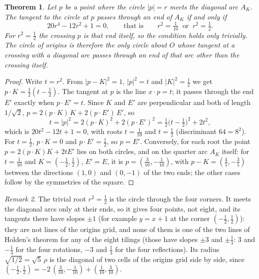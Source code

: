 \documentclass[11pt,a4paper]{article}
\theoremstyle{plain}
\newtheorem{theorem}{Theorem}
\theoremstyle{definition}
\theoremstyle{remark}
\newtheorem{remark}[theorem]{Remark}
\begin{document}
\begin{theorem}\label{thm:unique}
Let $p$ be a point where the circle $|p|=r$ meets the diagonal arc $A_K$. The tangent to the circle at $p$ passes through an end of $A_K$ if and only if
\[
  20r^4-12r^2+1=0, \qquad\text{that is}\qquad r^2=\tfrac1{10}\ \text{ or }\ r^2=\tfrac12 .
\]
For $r^2=\tfrac12$ the crossing $p$ is that end itself, so the condition holds only trivially. The circle of origins is therefore the only circle about $O$ whose tangent at a crossing with a diagonal arc passes through an end of that arc other than the crossing itself.
\end{theorem}

\begin{proof}
Write $t=r^2$. From $|p-K|^2=1$, $|p|^2=t$ and $|K|^2=\tfrac12$ we get $p\cdot K=\tfrac12(t-\tfrac12)$. The tangent at $p$ is the line $x\cdot p=t$; it passes through the end $E'$ exactly when $p\cdot E'=t$. Since $K$ and $E'$ are perpendicular and both of length $1/\sqrt2$, $p=2(p\cdot K)\,K+2(p\cdot E')\,E'$, so
\[
  t=|p|^2 = 2(p\cdot K)^2 + 2(p\cdot E')^2 = \tfrac12\bigl(t-\tfrac12\bigr)^2 + 2t^2 ,
\]
which is $20t^2-12t+1=0$, with roots $t=\tfrac1{10}$ and $t=\tfrac12$ (discriminant $64=8^2$). For $t=\tfrac12$, $p\cdot K=0$ and $p\cdot E'=\tfrac12$, so $p=E'$. Conversely, for each root the point $p=2(p\cdot K)K+2tE'$ lies on both circles, and on the quarter arc $A_K$ itself: for $t=\tfrac1{10}$ and $K=(-\tfrac12,\tfrac12)$, $E'=E$, it is $p=(\tfrac3{10},-\tfrac1{10})$, with $p-K=(\tfrac45,-\tfrac35)$ between the directions $(1,0)$ and $(0,-1)$ of the two ends; the other cases follow by the symmetries of the square.
\end{proof}

\begin{remark}
The trivial root $r^2=\tfrac12$ is the circle through the four corners. It meets the diagonal arcs only at their ends, so it gives four points, not eight, and its tangents there have slopes $\pm1$ (for example $y=x+1$ at the corner $(-\tfrac12,\tfrac12)$): they are not lines of the origins grid, and none of them is one of the two lines of Holden's theorem for any of the eight tilings (those have slopes $\pm3$ and $\pm\tfrac13$: $3$ and $-\tfrac13$ for the four rotations, $-3$ and $\tfrac13$ for the four reflections). Its radius $\sqrt{1/2}=\sqrt5\,\rho$ is the diagonal of two cells of the origins grid side by side, since $(-\tfrac12,\tfrac12) = -2\,(\tfrac3{10},-\tfrac1{10}) + (\tfrac1{10},\tfrac3{10})$.
\end{remark}
\end{document}
